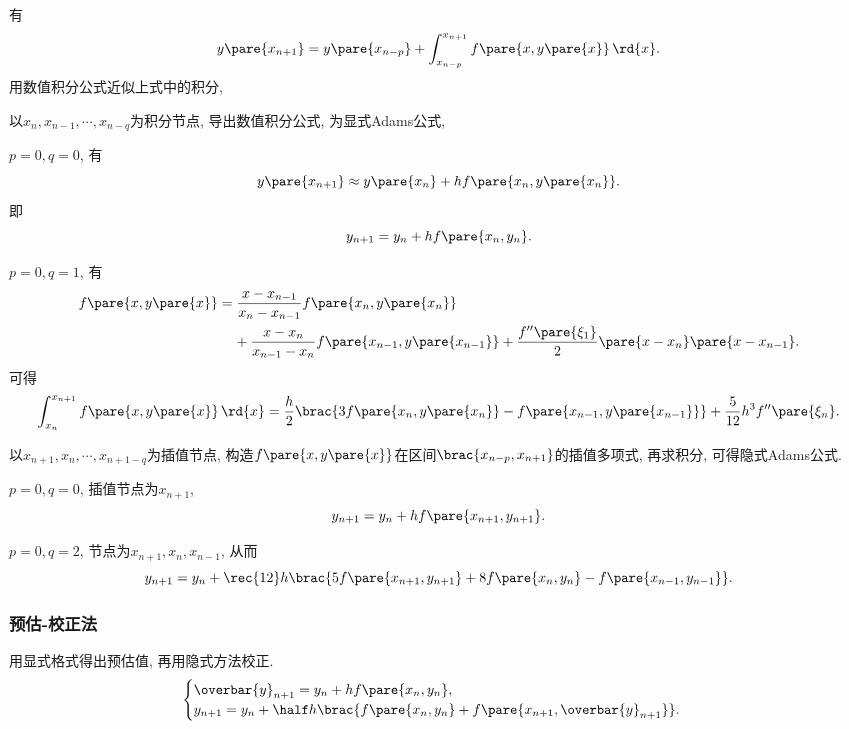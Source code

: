 \documentclass[hidelinks]{ctexart}
\begin{document}
有
\[ y\pare{x_{n+1}} = y\pare{x_{n-p}} + \int_{x_{n-p}}^{x_{n+1}} f\pare{x,y\pare{x}}\,\rd{x}. \]
用数值积分公式近似上式中的积分,
\begin{cenum}
    \item 以$x_n,x_{n-1},\cdots,x_{n-q}$为积分节点, 导出数值积分公式, 为显式Adams公式,
    \begin{citem}
        \item $p=0,q=0$, 有
        \[ y\pare{x_{n+1}} \approx y\pare{x_n} + hf\pare{x_n,y\pare{x_n}}. \]
        即
        \[ y_{n+1} = y_n + hf\pare{x_n,y_n}. \]
        \item $p=0, q=1$, 有
        \begin{align*}
            f\pare{x,y\pare{x}} &= \frac{x-x_{n-1}}{x_n-x_{n-1}}f\pare{x_n,y\pare{x_n}}\\
            & \phantom{=\ } + \frac{x-x_n}{x_{n-1}-x_n}f\pare{x_{n-1},y\pare{x_{n-1}}} + \frac{f''\pare{\xi_1}}{2} \pare{x-x_n}\pare{x-x_{n-1}}.
        \end{align*}
        可得
        \[ \int_{x_n}^{x_{n+1}}f\pare{x,y\pare{x}}\,\rd{x} = \frac{h}{2}\brac{3f\pare{x_n,y\pare{x_n}} - f\pare{x_{n-1}, y\pare{x_{n-1}}}} + \frac{5}{12}h^3f''\pare{\xi_n}. \]
    \end{citem}
    \item 以$x_{n+1},x_n,\cdots,x_{n+1-q}$为插值节点, 构造$f\pare{x,y\pare{x}}$在区间$\brac{x_{n-p},x_{n+1}}$的插值多项式, 再求积分, 可得隐式Adams公式.
    \begin{citem}
        \item $p=0,q=0$, 插值节点为$x_{n+1}$,
        \[ y_{n+1} = y_n + hf\pare{x_{n+1},y_{n+1}}. \]
        \item $p=0,q=2$, 节点为$x_{n+1}, x_n, x_{n-1}$, 从而
        \[ y_{n+1} = y_n + \rec{12}h\brac{5f\pare{x_{n+1},y_{n+1}} + 8f\pare{x_n,y_n} - f\pare{x_{n-1},y_{n-1}}}. \]
    \end{citem}
\end{cenum}


\subsubsection{预估-校正法} %
\label{ssub:预估_校正法}

用显式格式得出预估值, 再用隐式方法校正.
\[ \begin{cases}
    \overbar{y}_{n+1} = y_n + hf\pare{x_n,y_n}, \\
    \displaystyle y_{n+1} = y_n + \half h\brac{f\pare{x_n,y_n} + f\pare{x_{n+1},\overbar{y}_{n+1}}}.
\end{cases} \]
\end{document}
